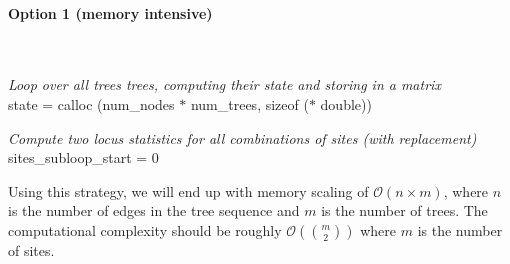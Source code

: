 \documentclass[12pt]{article}
\begin{document}
\paragraph{Option 1 (memory intensive)}
\mbox{} \\
\begin{algorithm}[H]

  \emph{Loop over all trees trees, computing their state and storing in a matrix} \\
  state = calloc (num\_nodes $\ast$ num\_trees, sizeof ($\ast$ double))
  
  \emph{Compute two locus statistics for all combinations of sites (with
replacement)} \\
  sites\_subloop\_start = 0

\end{algorithm}

Using this strategy, we will end up with memory scaling of $\mathcal{O}(n \times
m)$, where $n$ is the number of edges in the tree sequence and $m$ is the number
of trees. The computational complexity should be roughly $\mathcal{O}(\binom{m}{2})$
where $m$ is the number of sites.
\end{document}
